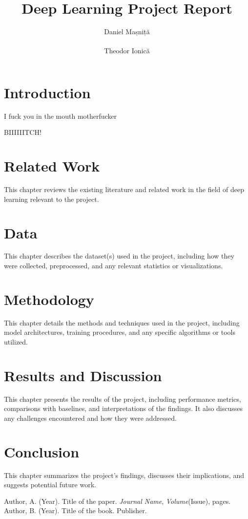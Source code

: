 \documentclass[12pt]{report}
\title{Deep Learning Project Report}
\author{Daniel Mașniță\\ \\ Theodor Ionică}
\date{}
\begin{document}
\maketitle

\tableofcontents
\newpage

\chapter{Introduction}
\label{chap:introduction}
I fuck you in the mouth motherfucker

BIIIIIITCH!

\chapter{Related Work}
\label{chap:related_work}
This chapter reviews the existing literature and related work in the field of deep learning relevant to the project.

\chapter{Data}
\label{chap:data}
This chapter describes the dataset(s) used in the project, including how they were collected, preprocessed, and any relevant statistics or visualizations.

\chapter{Methodology}
\label{chap:methodology}
This chapter details the methods and techniques used in the project, including model architectures, training procedures, and any specific algorithms or tools utilized.

\chapter{Results and Discussion}
\label{chap:results_discussion}
This chapter presents the results of the project, including performance metrics, comparisons with baselines, and interpretations of the findings. It also discusses any challenges encountered and how they were addressed.

\chapter{Conclusion}
\label{chap:conclusion}
This chapter summarizes the project's findings, discusses their implications, and suggests potential future work.

\begin{thebibliography}{99}
 Author, A. (Year). Title of the paper. \textit{Journal Name}, \textit{Volume}(Issue), pages.
 Author, B. (Year). Title of the book. Publisher.
\end{thebibliography}
\end{document}
